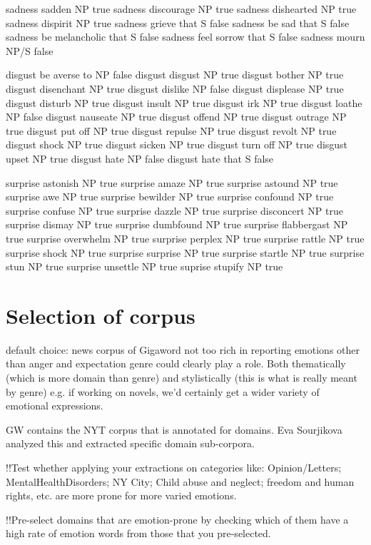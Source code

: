 sadness	sadden	NP	true
sadness	discourage	NP	true
sadness	dishearted	NP	true
sadness	dispirit	NP	true
sadness	grieve that S	false
sadness	be sad that	S	false
sadness	be melancholic that	S	false
sadness	feel sorrow that	S	false
sadness	mourn	NP/S	false

disgust	be averse to	NP	false
disgust	disgust	NP	true
disgust	bother	NP	true
disgust	disenchant	NP	true
disgust	dislike	NP	false
disgust	displease	NP	true
disgust	disturb	NP	true
disgust	insult	NP	true
disgust	irk	NP	true
disgust	loathe	NP	false
disgust	nauseate	NP	true
disgust	offend	NP	true
disgust	outrage	NP	true
disgust	put off	NP	true
disgust	repulse	NP	true
disgust	revolt	NP	true
disgust	shock	NP	true
disgust	sicken	NP	true
disgust	turn off	NP	true
disgust	upset	NP	true
disgust	hate	NP	false
disgust	hate that	S	false

surprise	astonish	NP	true
surprise	amaze	NP	true
surprise	astound	NP	true
surprise	awe	NP	true
surprise	bewilder	NP	true
surprise	confound	NP	true
surprise	confuse	NP	true
surprise	dazzle	NP	true
surprise	disconcert	NP	true
surprise	dismay	NP	true
surprise	dumbfound	NP	true
surprise	flabbergast	NP	true
surprise	overwhelm	NP	true
surprise	perplex	NP	true
surprise	rattle	NP	true
surprise	shock	NP	true
surprise	surprise	NP	true
surprise	startle	NP	true
surprise	stun	NP	true
surprise	unsettle	NP	true
suprise	stupify	NP	true

\section{Selection of corpus}

default choice: news corpus of Gigaword
not too rich in reporting emotions other than anger and expectation
genre could clearly play a role.
Both thematically (which is more domain than genre) and stylistically (this is what is really meant by genre)
e.g. if working on novels, we'd certainly get a wider variety of emotional expressions.

GW contains the NYT corpus that is annotated for domains. 
Eva Sourjikova analyzed this and extracted specific domain sub-corpora. 

!!Test whether applying your extractions on categories like: Opinion/Letters; MentalHealthDisorders; NY City; Child abuse and neglect; freedom and human rights, etc. are more prone for more varied emotions.

!!Pre-select domains that are emotion-prone by checking which of them have a high rate of emotion words from those that you pre-selected.

